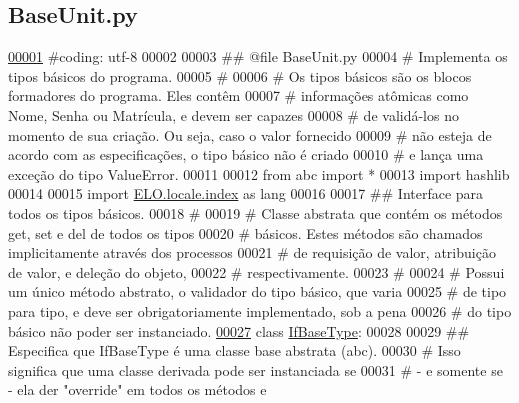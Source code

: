 \hypertarget{BaseUnit_8py_source}{}\subsection{Base\+Unit.\+py}
\label{BaseUnit_8py_source}

\begin{DoxyCode}
\hypertarget{BaseUnit_8py_source_l00001}{}\hyperlink{namespaceELO_1_1BaseUnit}{00001} \textcolor{comment}{#coding: utf-8}
00002 
00003 \textcolor{comment}{## @file BaseUnit.py}
00004 \textcolor{comment}{#  Implementa os tipos básicos do programa.}
00005 \textcolor{comment}{#}
00006 \textcolor{comment}{#   Os tipos básicos são os blocos formadores do programa. Eles contêm}
00007 \textcolor{comment}{#   informações atômicas como Nome, Senha ou Matrícula, e devem ser capazes}
00008 \textcolor{comment}{#   de validá-los no momento de sua criação. Ou seja, caso o valor fornecido}
00009 \textcolor{comment}{#   não esteja de acordo com as especificações, o tipo básico não é criado}
00010 \textcolor{comment}{#   e lança uma exceção do tipo ValueError.}
00011 
00012 \textcolor{keyword}{from} abc \textcolor{keyword}{import} *
00013 \textcolor{keyword}{import} hashlib
00014 
00015 \textcolor{keyword}{import} \hyperlink{namespaceELO_1_1locale_1_1index}{ELO.locale.index} \textcolor{keyword}{as} lang
00016 
00017 \textcolor{comment}{## Interface para todos os tipos básicos.}
00018 \textcolor{comment}{#}
00019 \textcolor{comment}{#   Classe abstrata que contém os métodos get, set e del de todos os tipos}
00020 \textcolor{comment}{#   básicos. Estes métodos são chamados implicitamente através dos processos}
00021 \textcolor{comment}{#   de requisição de valor, atribuição de valor, e deleção do objeto,}
00022 \textcolor{comment}{#   respectivamente.}
00023 \textcolor{comment}{#}
00024 \textcolor{comment}{#   Possui um único método abstrato, o validador do tipo básico, que varia}
00025 \textcolor{comment}{#   de tipo para tipo, e deve ser obrigatoriamente implementado, sob a pena}
00026 \textcolor{comment}{#   do tipo básico não poder ser instanciado.}
\hypertarget{BaseUnit_8py_source_l00027}{}\hyperlink{classELO_1_1BaseUnit_1_1IfBaseType}{00027} \textcolor{keyword}{class }\hyperlink{classELO_1_1BaseUnit_1_1IfBaseType}{IfBaseType}:
00028 
00029     \textcolor{comment}{## Especifica que IfBaseType é uma classe base abstrata (abc). }
00030     \textcolor{comment}{#   Isso significa que uma classe derivada pode ser instanciada se}
00031     \textcolor{comment}{#   - e somente se - ela der "override" em todos os métodos e}

\end{DoxyCode}
